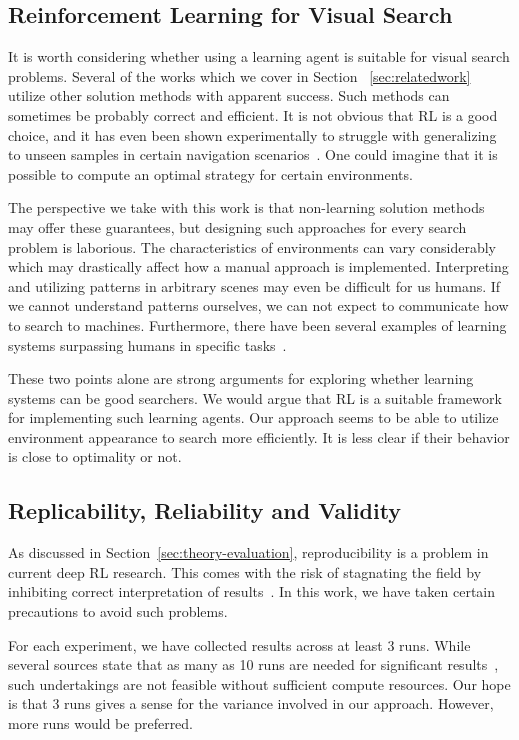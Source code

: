 \subsection{Reinforcement Learning for Visual Search}

It is worth considering whether using a learning agent is suitable for visual search problems.
Several of the works which we cover in Section ~\ref{sec:relatedwork} utilize other solution methods with apparent success.
Such methods can sometimes be probably correct and efficient.
It is not obvious that RL is a good choice, and it has even been shown experimentally to struggle with generalizing to unseen samples in certain navigation scenarios~\cite{dhiman_critical_2019}.
One could imagine that it is possible to compute an optimal strategy for certain environments.

The perspective we take with this work is that non-learning solution methods may offer these guarantees, but designing such approaches for every search problem is laborious.
The characteristics of environments can vary considerably which may drastically affect how a manual approach is implemented.
Interpreting and utilizing patterns in arbitrary scenes may even be difficult for us humans.
If we cannot understand patterns ourselves, we can not expect to communicate how to search to machines.
Furthermore, there have been several examples of learning systems surpassing humans in specific tasks~\cite{silver_mastering_2016,vinyals_grandmaster_2019}.

These two points alone are strong arguments for exploring whether learning systems can be good searchers.
We would argue that RL is a suitable framework for implementing such learning agents.
Our approach seems to be able to utilize environment appearance to search more efficiently.
It is less clear if their behavior is close to optimality or not.

\subsection{Replicability, Reliability and Validity}

As discussed in Section~\ref{sec:theory-evaluation}, reproducibility is a problem in current deep RL research.
This comes with the risk of stagnating the field by inhibiting correct interpretation of results~\cite{henderson_deep_2018}.
In this work, we have taken certain precautions to avoid such problems.

For each experiment, we have collected results across at least 3 runs.
While several sources state that as many as 10 runs are needed for significant results~\cite{colas_hitchhikers_2019,agarwal_deep_2022},
such undertakings are not feasible without sufficient compute resources.
Our hope is that 3 runs gives a sense for the variance involved in our approach.
However, more runs would be preferred.

